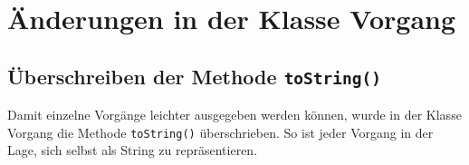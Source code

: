 \section{\"Anderungen in der Klasse Vorgang}

\subsection{\"Uberschreiben der Methode \texttt{toString()}}

Damit einzelne Vorg\"ange leichter ausgegeben werden k\"onnen, wurde
in der Klasse Vorgang die Methode \texttt{toString()}
\"uberschrieben. So ist jeder Vorgang in der Lage, sich selbst als
String zu repr\"asentieren.
